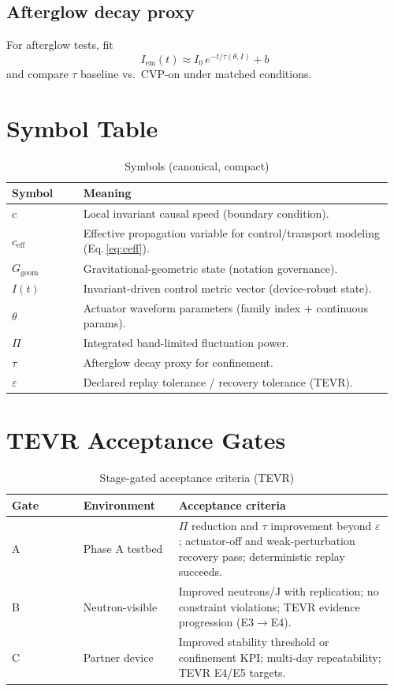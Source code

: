 \documentclass[conference]{IEEEtran}
\newcommand{\cEff}{c_{\mathrm{eff}}}
\newcommand{\Ggeom}{G_{\mathrm{geom}}}
\newcommand{\PiBand}{\Pi}
\begin{document}
\subsection{Afterglow decay proxy}
For afterglow tests, fit
\begin{equation}
I_{\mathrm{em}}(t) \approx I_0\, e^{-t/\tau(\theta,I)} + b
\end{equation}
and compare $\tau$ baseline vs.\ CVP-on under matched conditions.

\section{Symbol Table}
\begin{table}[t]
\caption{Symbols (canonical, compact)}
\centering
\begin{tabular}{@{}p{0.18\linewidth}p{0.78\linewidth}@{}}
\toprule
\textbf{Symbol} & \textbf{Meaning} \\
\midrule
$c$ & Local invariant causal speed (boundary condition).\\
$\cEff$ & Effective propagation variable for control/transport modeling (Eq.\,\ref{eq:ceff}).\\
$\Ggeom$ & Gravitational-geometric state (notation governance).\\
$I(t)$ & Invariant-driven control metric vector (device-robust state).\\
$\theta$ & Actuator waveform parameters (family index + continuous params).\\
$\PiBand$ & Integrated band-limited fluctuation power.\\
$\tau$ & Afterglow decay proxy for confinement.\\
$\varepsilon$ & Declared replay tolerance / recovery tolerance (TEVR).\\
\bottomrule
\end{tabular}
\end{table}

\section{TEVR Acceptance Gates}
\begin{table}[t]
\caption{Stage-gated acceptance criteria (TEVR)}
\centering
\begin{tabular}{@{}p{0.18\linewidth}p{0.24\linewidth}p{0.54\linewidth}@{}}
\toprule
\textbf{Gate} & \textbf{Environment} & \textbf{Acceptance criteria} \\
\midrule
A & Phase A testbed & $\PiBand$ reduction and $\tau$ improvement beyond $\varepsilon$; actuator-off and weak-perturbation recovery pass; deterministic replay succeeds.\\
B & Neutron-visible & Improved neutrons/J with replication; no constraint violations; TEVR evidence progression (E3$\rightarrow$E4).\\
C & Partner device & Improved stability threshold or confinement KPI; multi-day repeatability; TEVR E4/E5 targets.\\
\bottomrule
\end{tabular}
\end{table}
\end{document}
